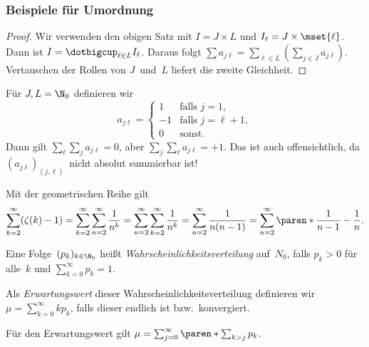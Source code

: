 \documentclass[a4paper]{article}
\begin{document}
\subsubsection{Beispiele für Umordnung}

\begin{proof}
    Wir verwenden den obigen Satz mit $I = J\times L$ und $I_\ell = J\times\mset{\ell}$. Dann ist $I = \dotbigcup_{\ell\in L} I_\ell$. Daraus folgt $\sum a_{j\ell} = \sum_{\ell\in L} (\sum_{j\in J} a_{j\ell})$. Vertauschen der Rollen von $J$~und~$L$ liefert die zweite Gleichheit.
\end{proof}

\begin{example}
    Für $J, L = \N_0$ definieren wir
    \begin{equation*}
        a_{j\ell} = \begin{cases}
            1  & \text{falls } j = 1,      \\
            -1 & \text{falls } j = \ell+1, \\
            0  & \text{sonst}.
        \end{cases}
    \end{equation*}
    Dann gilt $\sum_\ell \sum_j a_{j\ell} = 0$, aber $\sum_j \sum_\ell a_{j\ell} = +1$. Das ist auch offensichtlich, da $(a_{j\ell})_{(j,\ell)}$~nicht absolut summierbar ist!
\end{example}

\begin{example}
    Mit der geometrischen Reihe gilt
    \begin{equation*}
        \sum_{k=2}^\infty (\zeta(k)-1) = \sum_{k=2}^\infty \sum_{n=2}^\infty \frac{1}{n^k} = \sum_{n=2}^\infty \sum_{k=2}^\infty \frac{1}{n^k} = \sum_{n=2}^\infty \frac{1}{n(n-1)} = \sum_{n=2}^\infty \paren*{\frac{1}{n-1} - \frac{1}{n}}.
    \end{equation*}
\end{example}

\begin{notation}
    Eine Folge~$(p_k)_{k\in\N_0}$ heißt \emph{Wahrscheinlichkeitsverteilung} auf~$N_0$, falls $p_k > 0$ für alle~$k$ und $\sum_{k=0}^\infty p_k = 1$.

    Als \emph{Erwartungswert} dieser Wahrscheinlichkeitsverteilung definieren wir $\mu = \sum_{k=0}^\infty kp_k$, falls dieser endlich ist bzw.\ konvergiert.
\end{notation}

\begin{theorem}
    Für den Erwartungswert gilt $\mu = \sum_{j=0}^\infty \paren*{\sum_{k>j} p_k}$.
\end{theorem}
\end{document}

